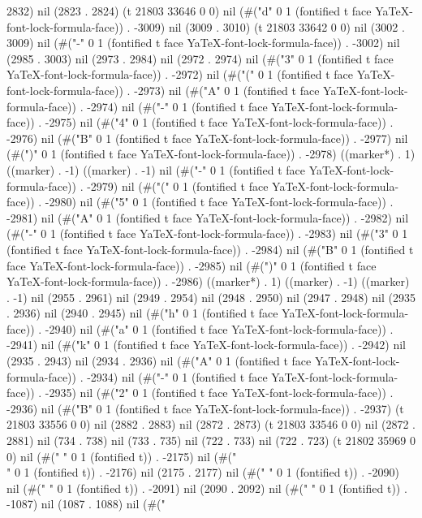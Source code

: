 2832) nil (2823 . 2824) (t 21803 33646 0 0) nil (#("d" 0 1 (fontified t face YaTeX-font-lock-formula-face)) . -3009) nil (3009 . 3010) (t 21803 33642 0 0) nil (3002 . 3009) nil (#("-" 0 1 (fontified t face YaTeX-font-lock-formula-face)) . -3002) nil (2985 . 3003) nil (2973 . 2984) nil (2972 . 2974) nil (#("3" 0 1 (fontified t face YaTeX-font-lock-formula-face)) . -2972) nil (#("(" 0 1 (fontified t face YaTeX-font-lock-formula-face)) . -2973) nil (#("A" 0 1 (fontified t face YaTeX-font-lock-formula-face)) . -2974) nil (#("-" 0 1 (fontified t face YaTeX-font-lock-formula-face)) . -2975) nil (#("4" 0 1 (fontified t face YaTeX-font-lock-formula-face)) . -2976) nil (#("B" 0 1 (fontified t face YaTeX-font-lock-formula-face)) . -2977) nil (#(")" 0 1 (fontified t face YaTeX-font-lock-formula-face)) . -2978) ((marker*) . 1) ((marker) . -1) ((marker) . -1) nil (#("-" 0 1 (fontified t face YaTeX-font-lock-formula-face)) . -2979) nil (#("(" 0 1 (fontified t face YaTeX-font-lock-formula-face)) . -2980) nil (#("5" 0 1 (fontified t face YaTeX-font-lock-formula-face)) . -2981) nil (#("A" 0 1 (fontified t face YaTeX-font-lock-formula-face)) . -2982) nil (#("-" 0 1 (fontified t face YaTeX-font-lock-formula-face)) . -2983) nil (#("3" 0 1 (fontified t face YaTeX-font-lock-formula-face)) . -2984) nil (#("B" 0 1 (fontified t face YaTeX-font-lock-formula-face)) . -2985) nil (#(")" 0 1 (fontified t face YaTeX-font-lock-formula-face)) . -2986) ((marker*) . 1) ((marker) . -1) ((marker) . -1) nil (2955 . 2961) nil (2949 . 2954) nil (2948 . 2950) nil (2947 . 2948) nil (2935 . 2936) nil (2940 . 2945) nil (#("h" 0 1 (fontified t face YaTeX-font-lock-formula-face)) . -2940) nil (#("a" 0 1 (fontified t face YaTeX-font-lock-formula-face)) . -2941) nil (#("k" 0 1 (fontified t face YaTeX-font-lock-formula-face)) . -2942) nil (2935 . 2943) nil (2934 . 2936) nil (#("A" 0 1 (fontified t face YaTeX-font-lock-formula-face)) . -2934) nil (#("-" 0 1 (fontified t face YaTeX-font-lock-formula-face)) . -2935) nil (#("2" 0 1 (fontified t face YaTeX-font-lock-formula-face)) . -2936) nil (#("B" 0 1 (fontified t face YaTeX-font-lock-formula-face)) . -2937) (t 21803 33556 0 0) nil (2882 . 2883) nil (2872 . 2873) (t 21803 33546 0 0) nil (2872 . 2881) nil (734 . 738) nil (733 . 735) nil (722 . 733) nil (722 . 723) (t 21802 35969 0 0) nil (#("
" 0 1 (fontified t)) . -2175) nil (#("\\" 0 1 (fontified t)) . -2176) nil (2175 . 2177) nil (#("
" 0 1 (fontified t)) . -2090) nil (#("	" 0 1 (fontified t)) . -2091) nil (2090 . 2092) nil (#("
" 0 1 (fontified t)) . -1087) nil (1087 . 1088) nil (#("
